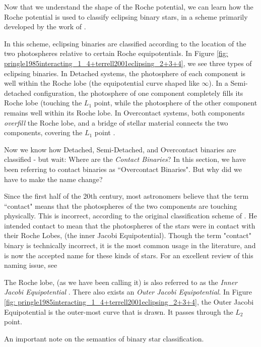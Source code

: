 \documentclass[12pt]{article} %
\numberwithin{equation}{section} %
\begin{document}
Now that we understand the shape of the Roche potential, we can learn how the Roche potential is used to classify eclipsing binary stars, in a scheme primarily developed by the work of \citet{kopal1959close}.

In this scheme, eclipsing binaries are classified according to the location of the two photospheres relative to certain Roche equipotentials. In Figure \ref{fig: pringle1985interacting_1_4+terrell2001eclipsing_2+3+4}, we see three types of eclipsing binaries. In Detached systems, the photosphere of each component is well within the Roche lobe (the equipotential curve shaped like $\infty$). In a Semi-detached configuration, the photosphere of one component completely fills its Roche lobe (touching the $L_{1}$ point, while the photosphere of the other component remains well within its Roche lobe. In Overcontact systems, both components \emph{overfill} the Roche lobe, and a bridge of stellar material connects the two components, covering the $L_{1}$ point \citep{terrell2001eclipsing}.

Now we know how Detached, Semi-Detached, and Overcontact binaries are classified - but wait: Where are the \emph{Contact Binaries}? In this section, we have been referring to contact binaries as ``Overcontact Binaries". But why did we have to make the name change?

Since the first half of the 20th century, most astronomers believe that the term ``contact" means that the photospheres of the two components are touching physically. This is incorrect, according to the original classification scheme of \citet{kopal1959close}. He intended contact to mean that the photospheres of the stars were in contact with their Roche Lobes, (the inner Jacobi Equipotential). Though the term "contact" binary is technically incorrect, it is the most common usage in the literature, and is now the accepted name for these kinds of stars. For an excellent review of this naming issue, see \citet{wilson2001binary}

The Roche lobe, (as we have been calling it) is also referred to as the \emph{Inner Jacobi Equipotential} . There also exists an \emph{Outer Jacobi Equipotential}. In Figure \ref{fig: pringle1985interacting_1_4+terrell2001eclipsing_2+3+4}, the Outer Jacobi Equipotential is the outer-most curve that is drawn. It passes through the $L_{2}$ point.

An important note on the semantics of binary star classification. \citet{kuiper1941interpretation}
\end{document}
